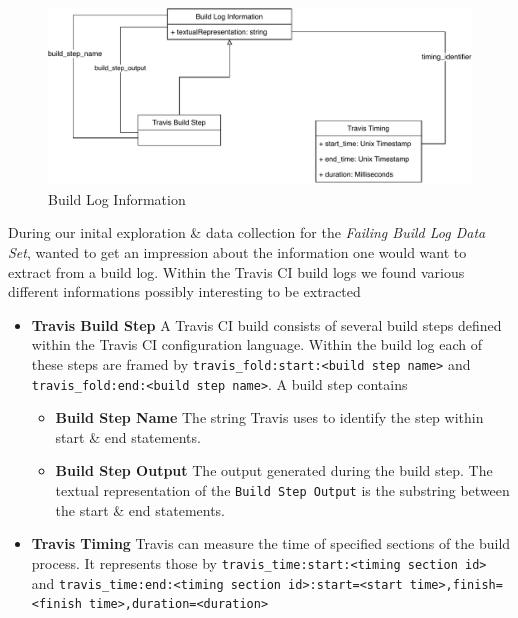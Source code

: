 \documentclass[\myrootdir/main.tex]{subfiles}
\begin{document}
\begin{figure}[h]
	\centering
	\includegraphics[width=\textwidth]{img/mt-graphics-BuildLogInformation.pdf}
	\caption{Build Log Information}
	\label{fig:build-log-information}
\end{figure}
During our inital exploration \& data collection for the \emph{Failing Build Log Data Set}, wanted to get an impression about the information one would want to extract from a build log. Within the Travis CI build logs we found various different informations possibly interesting to be extracted
\begin{itemize}
	\item \textbf{Travis Build Step} A Travis CI build consists of several build steps defined within the Travis CI configuration language. Within the build log each of these steps are framed by \lstinline{travis_fold:start:<build step name>} and \lstinline{travis_fold:end:<build step name>}.
	      A build step contains
	      \begin{itemize}
		      \item \textbf{Build Step Name} The string Travis uses to identify the step within start \& end statements.
		      \item \textbf{Build Step Output} The output generated during the build step. The textual representation of the \texttt{Build Step Output} is the substring between the start \& end statements.
	      \end{itemize}
	\item \textbf{Travis Timing} Travis can measure the time of specified sections of the build process. It represents those by \lstinline{travis_time:start:<timing section id>} and \lstinline{travis_time:end:<timing section id>:start=<start time>,finish=<finish time>,duration=<duration>}
\end{itemize}

\end{document}
